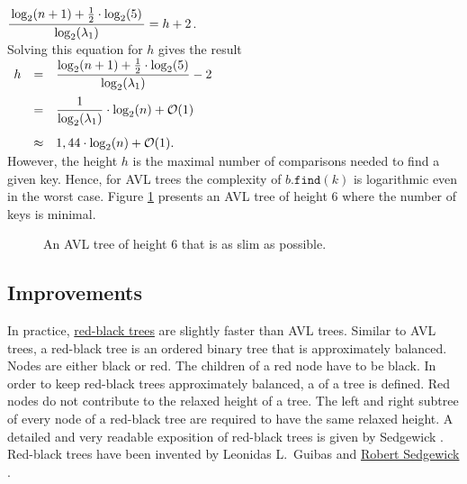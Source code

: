 \hspace*{1.3cm}
$\ds \bruch{\log_2(n+1) + \frac{1}{2}\cdot \log_2(5)}{\log_2(\lambda_1)} = h+2$.
\\[0.2cm]
Solving this equation for  $h$ gives the result 
\\[0.4cm]
\hspace*{1.3cm} 
$
\begin{array}[t]{lcl}
h & = & \displaystyle \frac{\log_2(n+1) + \frac{1}{2}\cdot \log_2(5)}{\log_2(\lambda_1)} - 2 \\[0.4cm]
  & = & \displaystyle \frac{1}{\log_2(\lambda_1)}\cdot \log_2(n) + \mathcal{O}(1) \\[0.5cm]
  & \approx & 1,44 \cdot \log_2(n) + \mathcal{O}(1).
\end{array} 
$
\\[0.2cm]
However, the height $h$ is the maximal number of comparisons needed to find a given key.
Hence, for AVL trees the complexity of $b.\mathtt{find}(k)$ is logarithmic even in the worst case.
Figure 
\ref{fig:avl-worst-case} presents an  AVL tree of height 6 where the number of keys is minimal.



\begin{figure}[!ht]
  \centering
  \caption{An AVL tree of height 6 that is as slim as possible.}
  \label{fig:avl-worst-case}
\end{figure}

\subsection{Improvements}
In practice, 
\href{https://en.wikipedia.org/wiki/Red-black_trees}{red-black trees} 
are slightly faster than \textsc{AVL} trees.  Similar to
\textsc{AVL} trees, a  red-black tree
  is an ordered binary tree that is approximately balanced.  Nodes are either black or red.
The children of a red node have to be black.  In order to keep red-black trees approximately
balanced, a  of a tree is defined.  Red nodes do not contribute to the relaxed
height of a tree.  The left and right subtree of every node of a red-black tree are required to have the same 
relaxed height.  A detailed and very readable exposition of red-black trees is given by Sedgewick
\cite{sedgewick:2011}.  Red-black trees have been invented by Leonidas L.~Guibas and 
\href{https://en.wikipedia.org/wiki/Robert_Sedgewick_(computer_scientist)}{Robert Sedgewick} \cite{guibas:78}.

